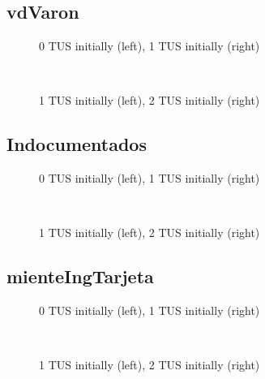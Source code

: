 \documentclass[12pt]{article}
\begin{document}
\subsection{vdVaron}
\begin{figure}[H]%
	\centering
	\caption*{0 TUS initially (left), 1 TUS initially (right)}
	 \quad 
	 \\
	
	\caption*{1 TUS initially (left), 2 TUS initially (right)}
	 \qquad
	\label{fig:vdVaronTwo}%
\end{figure}

\subsection{Indocumentados}
\begin{figure}[H]%
	\centering
	\caption*{0 TUS initially (left), 1 TUS initially (right)}
	 \quad 
	 \\
	
	\caption*{1 TUS initially (left), 2 TUS initially (right)}
	 \qquad
	\label{fig:indocumentadosTwo}%
\end{figure}

\subsection{mienteIngTarjeta}
\begin{figure}[H]%
	\centering
	\caption*{0 TUS initially (left), 1 TUS initially (right)}
	 \quad 
	 \\
	
	\caption*{1 TUS initially (left), 2 TUS initially (right)}
	 \qquad
	\label{fig:mienteIngTarjetaTwo}%
\end{figure}
\end{document}
